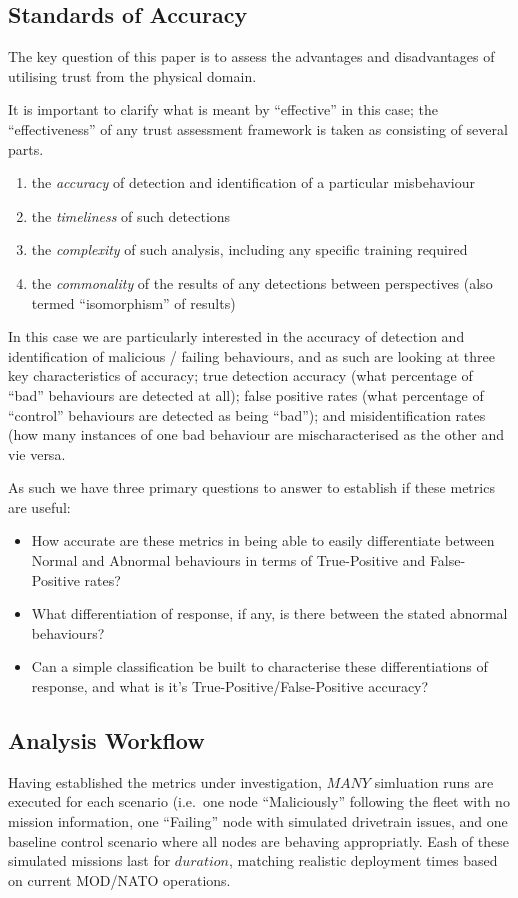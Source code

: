\documentclass[conference]{IEEEtran}
\begin{document}
\subsection{Standards of Accuracy}

The key question of this paper is to assess the advantages and disadvantages of utilising trust from the physical domain. 

It is important to clarify what is meant by ``effective'' in this case; the ``effectiveness'' of any trust assessment framework is taken as consisting of several parts.

\begin{enumerate}
  \item the \emph{accuracy} of detection and identification of a particular misbehaviour
  \item the \emph{timeliness} of such detections
  \item the \emph{complexity} of such analysis, including any specific training required
  \item the \emph{commonality} of the results of any detections between perspectives (also termed ``isomorphism'' of results)
\end{enumerate}

In this case we are particularly interested in the accuracy of detection and identification of malicious / failing behaviours, and as such are looking at three key characteristics of accuracy; true detection accuracy (what percentage of ``bad'' behaviours are detected at all); false positive rates (what percentage of ``control'' behaviours are detected as being ``bad''); and misidentification rates (how many instances of one bad behaviour are mischaracterised as the other and vie versa.

As such we have three primary questions to answer to establish if these metrics are useful:
\begin{itemize}
  \item How accurate are these metrics in being able to easily differentiate between Normal and Abnormal behaviours in terms of True-Positive and False-Positive rates?
  \item What differentiation of response, if any, is there between the stated abnormal behaviours?
  \item Can a simple classification be built to characterise these differentiations of response, and what is it's True-Positive/False-Positive accuracy?
\end{itemize}


\subsection{Analysis Workflow}
Having established the metrics under investigation, $MANY$ simluation runs are executed for each scenario (i.e.\ one node ``Maliciously'' following the fleet with no mission information, one ``Failing'' node with simulated drivetrain issues, and one baseline control scenario where all nodes are behaving appropriatly.
Eash of these simulated missions last for $duration$, matching realistic deployment times based on current MOD/NATO operations\cite{Bolster2014a}\cite{SomethingElse}.
\end{document}
